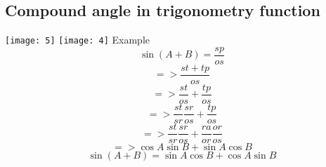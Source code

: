 \subsection{Compound angle in trigonometry function}
\texttt{[image: 5]}
\texttt{[image: 4]}
\newline
Example
\begin{equation}
\sin(A+B)=\frac{sp}{os}
\end{equation}
\begin{displaymath}
=>\frac{st+tp}{os}
\end{displaymath}
\begin{displaymath}
=>\frac{st}{os}+\frac{tp}{os}
\end{displaymath}
\begin{displaymath}
=>\frac{st}{sr}\frac{sr}{os}+\frac{tp}{os}
\end{displaymath}
\begin{displaymath}
=>\frac{st}{sr}\frac{sr}{os}+\frac{ra}{or}\frac{or}{os}
\end{displaymath}
\begin{displaymath}
=> \cos A\sin B+\sin A\cos B
\end{displaymath}
\begin{equation}
\sin(A+B) = \sin A\cos B+\cos A\sin B
\end{equation}

